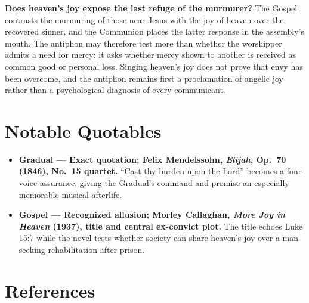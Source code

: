 \begin{deepstudy}
\noindent\textbf{Does heaven's joy expose the last refuge of the murmurer?\enspace{}}
The Gospel contrasts the murmuring of those near Jesus with the joy of heaven over the recovered sinner, and the Communion places the latter response in the assembly's mouth. The antiphon may therefore test more than whether the worshipper admits a need for mercy: it asks whether mercy shown to another is received as common good or personal loss. Singing heaven's joy does not prove that envy has been overcome, and the antiphon remains first a proclamation of angelic joy rather than a psychological diagnosis of every communicant.

\sectionguard
\section*{Notable Quotables}
{\small
\begin{itemize}[itemsep=0em,topsep=0.15em,parsep=0pt]
\item \textbf{Gradual --- Exact quotation; Felix Mendelssohn, \emph{Elijah}, Op.~70 (1846), No.~15 quartet.} ``Cast thy burden upon the Lord'' becomes a four-voice assurance, giving the Gradual's command and promise an especially memorable musical afterlife.
\item \textbf{Gospel --- Recognized allusion; Morley Callaghan, \emph{More Joy in Heaven} (1937), title and central ex-convict plot.} The title echoes Luke 15:7 while the novel tests whether society can share heaven's joy over a man seeking rehabilitation after prison.
\end{itemize}
}

\newpage
\sectionguard
\section*{References}


\end{deepstudy}
